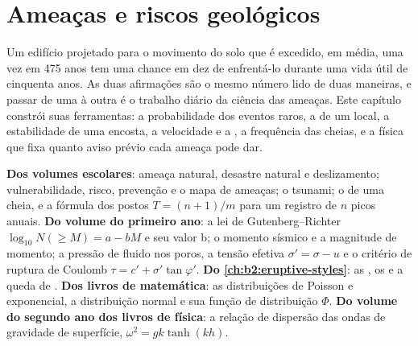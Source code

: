 \chapter{Ameaças e riscos geológicos}\label{ch:b2:geological-hazards}

Um edifício projetado para o movimento do solo que é excedido, em média, uma vez em 475 anos tem
uma chance em dez de enfrentá-lo durante uma vida útil de cinquenta anos. As duas afirmações são o mesmo número
lido de duas maneiras, e passar de uma à outra é o trabalho diário da ciência das ameaças. Este capítulo
constrói suas ferramentas: a probabilidade dos eventos raros, a  de um local, a estabilidade de uma
encosta, a velocidade e a , a frequência das cheias, e a física que fixa
quanto aviso prévio cada ameaça pode dar.

\begin{recall}
\textbf{Dos volumes escolares}: ameaça natural, desastre natural e deslizamento; vulnerabilidade,
risco, prevenção e o mapa de ameaças; o tsunami; o  de uma cheia, e a fórmula dos postos
$T = (n + 1)/m$ para um registro de $n$ picos anuais. \textbf{Do volume do primeiro ano}: a
lei de Gutenberg--Richter $\log_{10} N(\geq M) = a - bM$ e seu valor b; o momento sísmico e a magnitude
de momento; a pressão de fluido nos poros, a tensão efetiva $\sigma' = \sigma - u$ e o critério de ruptura
de Coulomb $\tau = c' + \sigma' \tan\varphi'$. \textbf{Do \cref{ch:b2:eruptive-styles}}: as , os  e a queda de . \textbf{Dos livros de matemática}: as distribuições de Poisson e
exponencial, a distribuição normal e sua função de distribuição $\Phi$.
\textbf{Do volume do segundo ano dos livros de física}: a relação de dispersão das ondas de gravidade de superfície,
$\omega^2 = gk\tanh(kh)$.
\end{recall}


